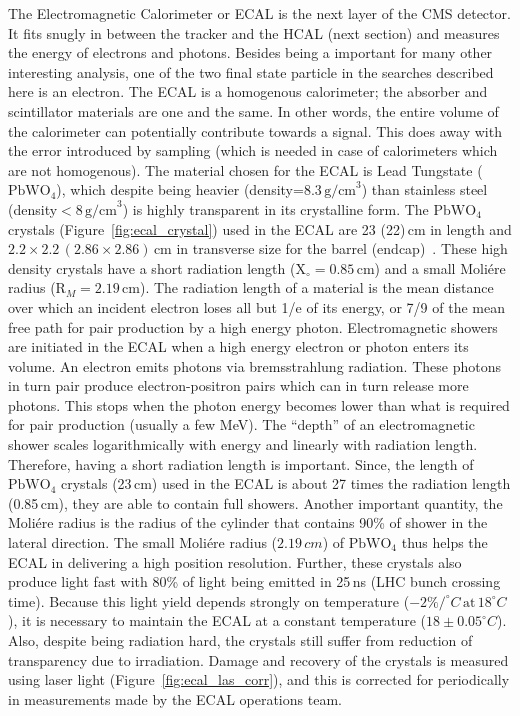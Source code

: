 The Electromagnetic Calorimeter or ECAL is the next layer of the CMS detector. It fits snugly in between the tracker and the HCAL (next section) and measures the energy of electrons and photons. Besides being a important for many other interesting analysis, one of the two final state particle in the searches described here is an electron. The ECAL is a homogenous calorimeter; the absorber and scintillator materials are one and the same. In other words, the entire volume of the calorimeter can potentially contribute towards a signal. This does away with the error introduced by sampling (which is needed in case of calorimeters which are not homogenous). The material chosen for the ECAL is Lead Tungstate ($\mathrm{PbWO}_4$), which despite being heavier (density=$8.3\,\mathrm{g/cm}^3$) than stainless steel (density$<8\,\mathrm{g/cm}^3$) is highly transparent in its crystalline form. The $\mathrm{PbWO}_4$ crystals (Figure~\ref{fig:ecal_crystal}) used in the ECAL are 23 (22)\,cm in length and $2.2\times2.2\,(2.86\times2.86)$\,cm in transverse size for the barrel (endcap)~\cite{ecal2}. These high density crystals have a short radiation length ($\mathrm{X}_{\circ}=0.85$\,cm) and a small Moli\'ere radius ($\mathrm{R}_{M}=2.19$\,cm). The radiation length of a material is the mean distance over which an incident electron loses all but 1/e of its energy, or 7/9 of the mean free path for pair production by a high energy photon. Electromagnetic showers are initiated in the ECAL when a high energy electron or photon enters its volume. An electron emits photons via bremsstrahlung radiation. These photons in turn pair produce electron-positron pairs which can in turn release more photons. This stops when the photon energy becomes lower than what is required for pair production (usually a few MeV). The ``depth'' of an electromagnetic shower scales logarithmically with energy and linearly with radiation length. Therefore, having a short radiation length is important. Since, the length of $\mathrm{PbWO}_4$ crystals (23\,cm) used in the ECAL is about 27 times the radiation length (0.85\,cm), they are able to contain full showers. Another important quantity, the Moli\'ere radius is the radius of the cylinder that contains 90\% of shower in the lateral direction. The small Moli\'ere radius ($2.19\,cm$) of $\mathrm{PbWO}_4$ thus helps the ECAL in delivering a high position resolution. Further, these crystals also produce light fast with 80\% of light being emitted in 25\,ns (LHC bunch crossing time). Because this light yield depends strongly on temperature ($-2\%/^{\circ}C\,\mathrm{at}\,18^{\circ}C$), it is necessary to maintain the ECAL at a constant temperature ($18\pm0.05^{\circ}C$). Also, despite being radiation hard, the crystals still suffer from reduction of transparency due to irradiation. Damage and recovery of the crystals is measured using laser light (Figure~\ref{fig:ecal_las_corr}), and this is corrected for periodically in measurements made by the ECAL operations team.     
